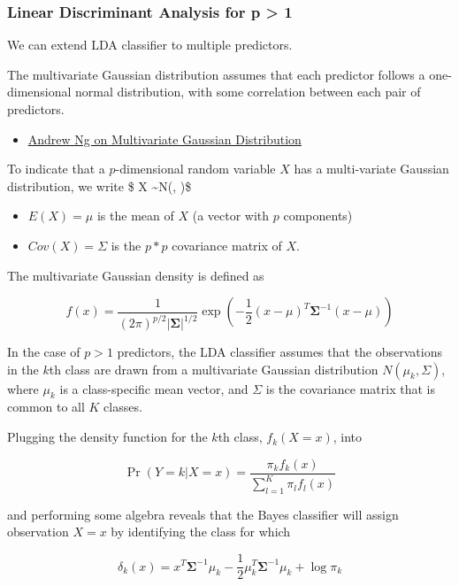 \documentclass[
]{article}
\providecommand{\tightlist}{%
  \setlength{\itemsep}{0pt}\setlength{\parskip}{0pt}}
\begin{document}
\hypertarget{linear-discriminant-analysis-for-p-1-1}{%
\subsubsection{Linear Discriminant Analysis for p \textgreater{}
1}\label{linear-discriminant-analysis-for-p-1-1}}

We can extend LDA classifier to multiple predictors.

The multivariate Gaussian distribution assumes that each predictor
follows a one-dimensional normal distribution, with some correlation
between each pair of predictors.

\begin{itemize}
\tightlist
\item
  \href{https://www.youtube.com/watch?v=JjB58InuTqM}{Andrew Ng on
  Multivariate Gaussian Distribution}
\end{itemize}

To indicate that a \(p\)-dimensional random variable \(X\) has a
multi-variate Gaussian distribution, we write \$ X \sim N(\mu, \Sigma)\$

\begin{itemize}
\tightlist
\item
  \(E(X) = \mu\) is the mean of \(X\) (a vector with \(p\) components)
\item
  \(Cov(X) = \Sigma\) is the \(p*p\) covariance matrix of \(X\).
\end{itemize}

The multivariate Gaussian density is defined as

\[
f(x)=\frac{1}{(2 \pi)^{p / 2}|\mathbf{\Sigma}|^{1 / 2}} \exp \left(-\frac{1}{2}(x-\mu)^{T} \mathbf{\Sigma}^{-1}(x-\mu)\right)
\]

In the case of \(p>1\) predictors, the LDA classifier assumes that the
observations in the \(k\)th class are drawn from a multivariate Gaussian
distribution \(N(\mu_k, \Sigma)\), where \(\mu_k\) is a class-specific
mean vector, and \(\Sigma\) is the covariance matrix that is common to
all \(K\) classes.

Plugging the density function for the \(k\)th class, \(f_k(X = x)\),
into

\[
\operatorname{Pr}(Y=k | X=x)=\frac{\pi_{k} f_{k}(x)}{\sum_{l=1}^{K} \pi_{l} f_{l}(x)}
\]

and performing some algebra reveals that the Bayes classifier will
assign observation \(X = x\) by identifying the class for which

\[
\delta_{k}(x)=x^{T} \boldsymbol{\Sigma}^{-1} \mu_{k}-\frac{1}{2} \mu_{k}^{T} \boldsymbol{\Sigma}^{-1} \mu_{k}+\log \pi_{k}
\]
\end{document}
